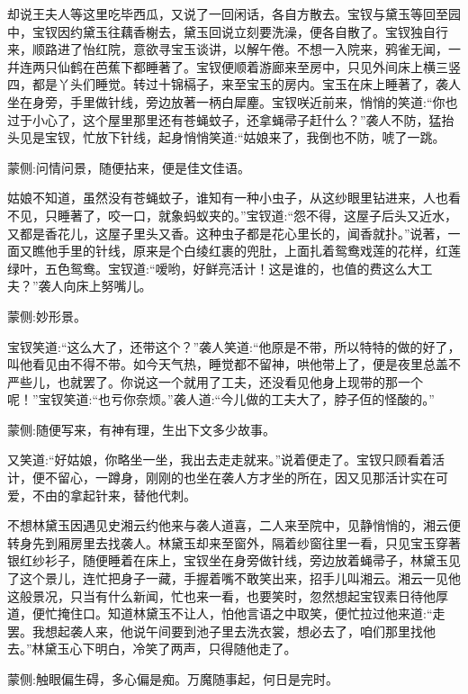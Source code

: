 \begin{parag}
    却说王夫人等这里吃毕西瓜，又说了一回闲话，各自方散去。宝钗与黛玉等回至园中，宝钗因约黛玉往藕香榭去，黛玉回说立刻要洗澡，便各自散了。宝钗独自行来，顺路进了怡红院，意欲寻宝玉谈讲，以解午倦。不想一入院来，鸦雀无闻，一幷连两只仙鹤在芭蕉下都睡著了。宝钗便顺着游廊来至房中，只见外间床上横三竖四，都是丫头们睡觉。转过十锦槅子，来至宝玉的房内。宝玉在床上睡著了，袭人坐在身旁，手里做针线，旁边放著一柄白犀麈。宝钗咲近前来，悄悄的笑道:“你也过于小心了，这个屋里那里还有苍蝇蚊子，还拿蝇帚子赶什么？”袭人不防，猛抬头见是宝钗，忙放下针线，起身悄悄笑道:“姑娘来了，我倒也不防，唬了一跳。\begin{note}蒙侧:问情问景，随便拈来，便是佳文佳语。\end{note}姑娘不知道，虽然没有苍蝇蚊子，谁知有一种小虫子，从这纱眼里钻进来，人也看不见，只睡著了，咬一口，就象蚂蚁夹的。”宝钗道:“怨不得，这屋子后头又近水，又都是香花儿，这屋子里头又香。这种虫子都是花心里长的，闻香就扑。”说著，一面又瞧他手里的针线，原来是个白绫红裹的兜肚，上面扎着鸳鸯戏莲的花样，红莲绿叶，五色鸳鸯。宝钗道:“嗳哟，好鲜亮活计！这是谁的，也值的费这么大工夫？”袭人向床上努嘴儿。\begin{note}蒙侧:妙形景。\end{note}宝钗笑道:“这么大了，还带这个？”袭人笑道:“他原是不带，所以特特的做的好了，叫他看见由不得不带。如今天气热，睡觉都不留神，哄他带上了，便是夜里总盖不严些儿，也就罢了。你说这一个就用了工夫，还没看见他身上现带的那一个呢！”宝钗笑道:“也亏你奈烦。”袭人道:“今儿做的工夫大了，脖子仾的怪酸的。”\begin{note}蒙侧:随便写来，有神有理，生出下文多少故事。\end{note}又笑道:“好姑娘，你略坐一坐，我出去走走就来。”说着便走了。宝钗只顾看着活计，便不留心，一蹲身，刚刚的也坐在袭人方才坐的所在，因又见那活计实在可爱，不由的拿起针来，替他代刺。
\end{parag}


\begin{parag}
    不想林黛玉因遇见史湘云约他来与袭人道喜，二人来至院中，见静悄悄的，湘云便转身先到厢房里去找袭人。林黛玉却来至窗外，隔着纱窗往里一看，只见宝玉穿著银红纱衫子，随便睡着在床上，宝钗坐在身旁做针线，旁边放着蝇帚子，林黛玉见了这个景儿，连忙把身子一藏，手握着嘴不敢笑出来，招手儿叫湘云。湘云一见他这般景况，只当有什么新闻，忙也来一看，也要笑时，忽然想起宝钗素日待他厚道，便忙掩住口。知道林黛玉不让人，怕他言语之中取笑，便忙拉过他来道:“走罢。我想起袭人来，他说午间要到池子里去洗衣裳，想必去了，咱们那里找他去。”林黛玉心下明白，冷笑了两声，只得随他走了。\begin{note}蒙侧:触眼偏生碍，多心偏是痴。万魔随事起，何日是完时。\end{note}
\end{parag}


